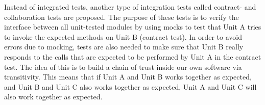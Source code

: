 Instead of integrated tests, another type of integration tests called
contract- and collaboration tests are proposed. The purpose of these
tests is to verify the interface between all unit-tested modules by
using mocks to test that Unit A tries to invoke the expected methods on
Unit B (contract test). In order to avoid errors due to mocking, tests
are also needed to make sure that Unit B really responds to the calls
that are expected to be performed by Unit A in the contract test. The
idea of this is to build a chain of trust inside our own software via
transitivity. This means that if Unit A and Unit B works together as
expected, and Unit B and Unit C also works together as expected, Unit A
and Unit C will also work together as expected.\\
